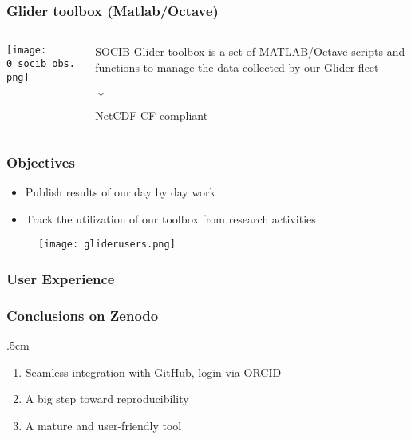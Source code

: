 \begin{frame}
\frametitle{Glider toolbox (Matlab/Octave)}

\begin{columns}

\begin{column}{0.6\textwidth}  %
    \begin{center}
     \texttt{[image: 0\_socib\_obs.png]}
     \end{center}
\end{column}

\begin{column}{0.4\textwidth}
SOCIB Glider toolbox is a set of MATLAB/Octave scripts and functions to manage the data collected by our Glider fleet

\begin{center}
$\downarrow$
\end{center}

NetCDF-CF compliant
\end{column}
\end{columns}
\end{frame}

\begin{frame}
\frametitle{Objectives}

\begin{itemize}
\item Publish results of our day by day work
\item Track the utilization of our toolbox from research activities
\end{itemize}

\begin{figure}
     \texttt{[image: gliderusers.png]}
\end{figure}
\end{frame}

\begin{frame}
\frametitle{User Experience}
\end{frame}

\begin{frame}[c]
\frametitle{Conclusions on Zenodo}

\parskip .5cm
\begin{enumerate}
\item Seamless integration with GitHub, login via ORCID
\item A big step toward reproducibility
\item A mature and user-friendly tool 
\end{enumerate}

\end{frame}

